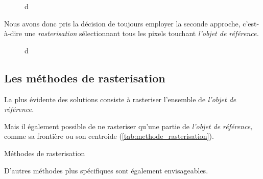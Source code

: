 \begin{figure}
  \centering
  
  \caption{d}
  \label{fig:rasterisation_sel_pixels}
\end{figure}

Nous avons donc pris la décision de toujours employer la seconde approche, c'est-à-dire une \emph{rasterisation} sélectionnant tous les pixels touchant \emph{l'objet de référence.}

\begin{figure}
  \centering
  
  \caption{d}
  \label{fig:rasterisation_cas_limite}
\end{figure}

\subsection{Les méthodes de rasterisation}



La plus évidente des solutions consiste à rasteriser l'ensemble de
\emph{l'objet de référence.}


Mais il également possible de ne rasteriser qu'une partie de
\emph{l'objet de référence,} comme sa frontière ou son centroide
(\autoref{tab:methode_rasterisation}).

\begin{table}
  \centering
  
  \caption{Méthodes de rasterisation}
  \label{tab:methode_rasterisation}
\end{table}


D'autres méthodes plus spécifiques sont également envisageables.

